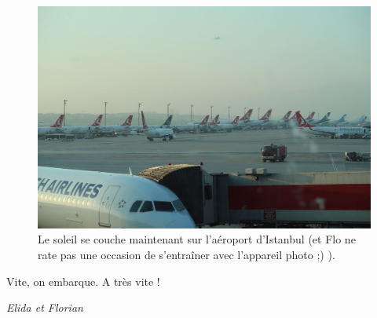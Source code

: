 \begin{figure}
\centering
\includegraphics{images/20180503_Escale_Istanbul.JPG}
\caption{Le soleil se couche maintenant sur l'aéroport d'Istanbul (et
Flo ne rate pas une occasion de s'entraîner avec l'appareil photo ;) ).}
\end{figure}

Vite, on embarque. A très vite !

\emph{Elida et Florian}


